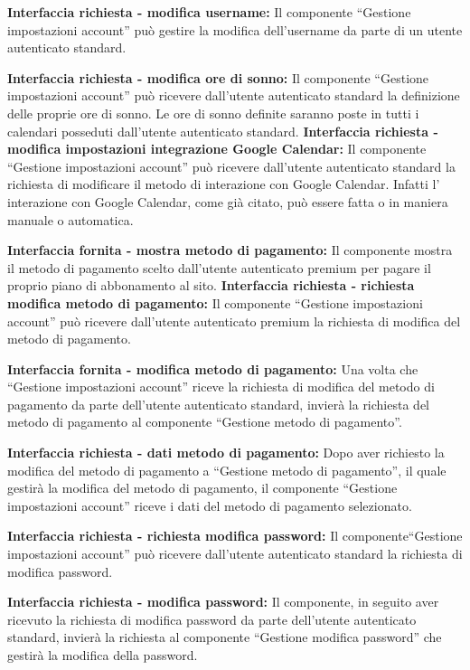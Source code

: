\begin{listaPersonale}[]{}
    \textbf{Interfaccia richiesta - modifica username:} Il componente “Gestione impostazioni account” può gestire la modifica dell'username da parte di un utente autenticato standard.

    \textbf{Interfaccia richiesta - modifica ore di sonno:} Il componente “Gestione impostazioni account” può ricevere dall'utente autenticato standard la definizione delle proprie ore di sonno. Le ore di sonno definite saranno poste in tutti i calendari posseduti dall'utente autenticato standard.
    \textbf{Interfaccia richiesta - modifica impostazioni integrazione
        Google Calendar:} Il componente “Gestione impostazioni account” può ricevere dall'utente autenticato standard la richiesta di modificare il metodo di interazione con Google Calendar. Infatti l' interazione con Google Calendar, come già citato, può essere fatta o in maniera manuale o automatica.

    \textbf{Interfaccia fornita - mostra metodo di pagamento:} Il componente mostra il metodo di pagamento scelto dall'utente autenticato premium per pagare il proprio piano di abbonamento al sito.
    \textbf{Interfaccia richiesta - richiesta modifica metodo di
        pagamento:} Il componente “Gestione impostazioni account” può ricevere dall'utente autenticato premium la richiesta di modifica del metodo di pagamento.

    \textbf{Interfaccia fornita - modifica metodo di pagamento:} Una volta che “Gestione impostazioni account” riceve la richiesta di modifica del metodo di pagamento da parte dell'utente autenticato standard, invierà la richiesta del metodo di pagamento al componente “Gestione metodo di pagamento”.

    \textbf{Interfaccia richiesta - dati metodo di pagamento:} Dopo aver richiesto la modifica del metodo di pagamento a “Gestione metodo di pagamento”, il quale gestirà la modifica del metodo di pagamento, il componente “Gestione impostazioni account” riceve i dati del metodo di pagamento selezionato.

    \textbf{Interfaccia richiesta - richiesta modifica password:} Il componente“Gestione impostazioni account” può ricevere dall'utente autenticato standard la richiesta di modifica password.

    \textbf{Interfaccia richiesta - modifica password:} Il componente, in seguito aver ricevuto la richiesta di modifica password da parte dell'utente autenticato standard, invierà la richiesta al componente “Gestione modifica password” che gestirà la modifica della password.


\end{listaPersonale}
